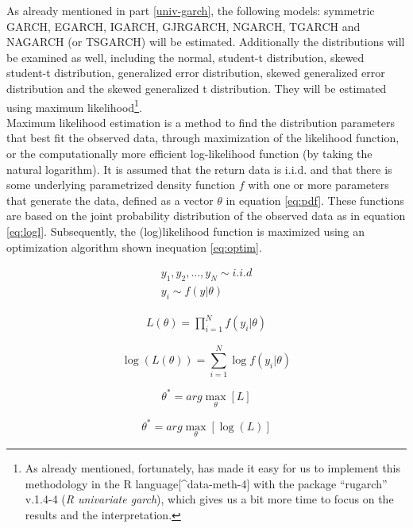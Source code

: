 \documentclass[a4paper, twoside]{templates/ociamthesis}
\begin{document}
\noindent As already mentioned in part \ref{univ-garch}, the following models: symmetric GARCH, EGARCH, IGARCH, GJRGARCH, NGARCH, TGARCH and NAGARCH (or TSGARCH) will be estimated. Additionally the distributions will be examined as well, including the normal, student-t distribution, skewed student-t distribution, generalized error distribution, skewed generalized error distribution and the skewed generalized t distribution. They will be estimated using maximum likelihood\footnote{As already mentioned, fortunately, \textcite{alexios2020} has made it easy for us to implement this methodology in the R language{[}\^{}data-meth-4{]} \autocite{Rteam} with the package ``rugarch'' v.1.4-4 (\emph{R univariate garch}), which gives us a bit more time to focus on the results and the interpretation.}.~\\

\noindent Maximum likelihood estimation is a method to find the distribution parameters that best fit the observed data, through maximization of the likelihood function, or the computationally more efficient log-likelihood function (by taking the natural logarithm). It is assumed that the return data is i.i.d. and that there is some underlying parametrized density function \(f\) with one or more parameters that generate the data, defined as a vector \(\theta\) in equation \eqref{eq:pdf}. These functions are based on the joint probability distribution of the observed data as in equation \eqref{eq:logl}. Subsequently, the (log)likelihood function is maximized using an optimization algorithm shown inequation \eqref{eq:optim}.

\begin{align} 
  y_1,y_2,...,y_N \sim i.i.d
    \\
  y_i \sim f(y|\theta)
 \label{eq:pdf}
\end{align}

\begin{align} 
 L(\theta) = \prod^N_{i=1}f(y_i|\theta)
 \label{eq:logl}
\end{align}

\[\log(L(\theta)) = \sum^N_{i=1} \log f(y_i |\theta)\]

\begin{equation} 
\theta^{*} = arg \max_{\theta} [ L] 
 \label{eq:optim}
\end{equation}

\begin{equation} 
\theta^{*} = arg \max_{\theta} [\log(L)]
\end{equation}
\end{document}

